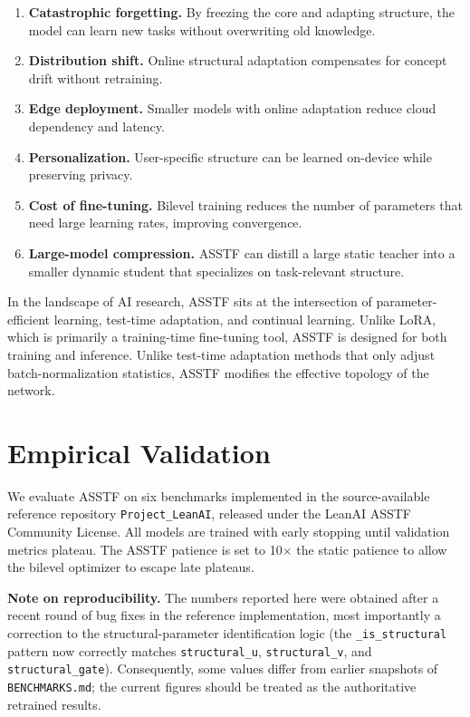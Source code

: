 \documentclass[11pt,a4paper]{article}
\theoremstyle{definition}
\begin{document}
\begin{enumerate}
    \item \textbf{Catastrophic forgetting.} By freezing the core and adapting structure, the model can learn new tasks without overwriting old knowledge.
    \item \textbf{Distribution shift.} Online structural adaptation compensates for concept drift without retraining.
    \item \textbf{Edge deployment.} Smaller models with online adaptation reduce cloud dependency and latency.
    \item \textbf{Personalization.} User-specific structure can be learned on-device while preserving privacy.
    \item \textbf{Cost of fine-tuning.} Bilevel training reduces the number of parameters that need large learning rates, improving convergence.
    \item \textbf{Large-model compression.} ASSTF can distill a large static teacher into a smaller dynamic student that specializes on task-relevant structure.
\end{enumerate}

In the landscape of AI research, ASSTF sits at the intersection of parameter-efficient learning, test-time adaptation, and continual learning. Unlike LoRA, which is primarily a training-time fine-tuning tool, ASSTF is designed for both training and inference. Unlike test-time adaptation methods that only adjust batch-normalization statistics, ASSTF modifies the effective topology of the network.

\section{Empirical Validation}
\label{sec:empirical}

We evaluate ASSTF on six benchmarks implemented in the source-available reference repository \texttt{Project\_LeanAI}, released under the LeanAI ASSTF Community License. All models are trained with early stopping until validation metrics plateau. The ASSTF patience is set to 10$\times$ the static patience to allow the bilevel optimizer to escape late plateaus.

\textbf{Note on reproducibility.} The numbers reported here were obtained after a recent round of bug fixes in the reference implementation, most importantly a correction to the structural-parameter identification logic (the \texttt{\_is\_structural} pattern now correctly matches \texttt{structural\_u}, \texttt{structural\_v}, and \texttt{structural\_gate}). Consequently, some values differ from earlier snapshots of \texttt{BENCHMARKS.md}; the current figures should be treated as the authoritative retrained results.
\end{document}

